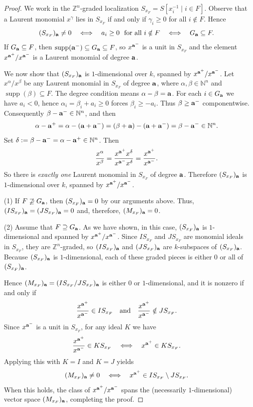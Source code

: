 \documentclass[12pt]{amsart}
\numberwithin{equation}{section}
\theoremstyle{definition}
\theoremstyle{definition}
\DeclareMathOperator{\supp}{supp}
\newcommand{\ZZ}{{\mathbb Z}}
\newcommand{\NN}{{\mathbb N}}
\def\a{{\bold a}}
\begin{document}
\begin{proof}
	We work in the $\ZZ^n$-graded localization $S_{x_F}=S[x_i^{-1}\mid i\in F]$.
	Observe that a Laurent monomial $x^\gamma$ lies in $S_{x_F}$ if and only if $\gamma_i\ge 0$ for all $i\notin F$.
	Hence
	\[
	(S_{x_F})_\a\neq 0 \quad\Longleftrightarrow\quad a_i\ge 0 \ \text{ for all } i\notin F
	\quad\Longleftrightarrow\quad G_\a\subseteq F.
	\]
	If $G_\a\subseteq F$, then $\supp(\a^-)\subseteq G_\a\subseteq F$, so $x^{\a^-}$ is a unit in $S_{x_F}$
	and the element $x^{\a^+}/x^{\a^-}$ is a Laurent monomial of degree $\a$.
	
	We now show that $(S_{x_F})_\a$ is $1$-dimensional over $k$, spanned by $x^{\a^+}/x^{\a^-}$.
	Let $x^\alpha/x^\beta$ be any Laurent monomial in $S_{x_F}$ of degree $\a$, where
	$\alpha,\beta\in\NN^n$ and $\supp(\beta)\subseteq F$. The degree condition means $\alpha-\beta=\a$.
	For each $i\in G_\a$ we have $a_i<0$, hence $\alpha_i=\beta_i+a_i\ge 0$ forces $\beta_i\ge -a_i$.
	Thus $\beta\ge \a^-$ componentwise. Consequently $\beta-\a^-\in\NN^n$, and then
	\[
	\alpha-\a^+=\alpha-(\a+\a^-)= (\beta+\a)-(\a+\a^-)=\beta-\a^-\in\NN^n.
	\]
	Set $\delta:=\beta-\a^-=\alpha-\a^+\in\NN^n$. Then
	\[
	\frac{x^\alpha}{x^\beta}
	=
	\frac{x^{\a^+}x^\delta}{x^{\a^-}x^\delta}
	=
	\frac{x^{\a^+}}{x^{\a^-}}.
	\]
	So there is \emph{exactly one} Laurent monomial in $S_{x_F}$ of degree $\a$.
	Therefore $(S_{x_F})_\a$ is $1$-dimensional over $k$, spanned by $x^{\a^+}/x^{\a^-}$.
	
	\smallskip
(1) If $F\not\supseteq G_\a$, then $(S_{x_F})_\a=0$ by our arguments above. Thus,
	$(I S_{x_F})_\a=(J S_{x_F})_\a=0$ and, therefore, $(M_{x_F})_\a=0$.
	
(2) Assume that $F\supseteq G_\a$. As we have shown, in this case, $(S_{x_F})_\a$ is $1$-dimensional and spanned by
	$x^{\a^+}/x^{\a^-}$. Since $I S_{x_F}$ and $J S_{x_F}$ are monomial ideals in $S_{x_F}$, they
	are $\ZZ^n$-graded, so $(I S_{x_F})_\a$ and $(J S_{x_F})_\a$ are $k$-subspaces of $(S_{x_F})_\a$.
	Because $(S_{x_F})_\a$ is $1$-dimensional, each of these graded pieces is either $0$ or all of
	$(S_{x_F})_\a$.
	
	Hence $(M_{x_F})_\a=(I S_{x_F}/J S_{x_F})_\a$ is either $0$ or $1$-dimensional, and it is nonzero
	if and only if
	\[
	\frac{x^{\a^+}}{x^{\a^-}}\in I S_{x_F}
	\quad\text{and}\quad
	\frac{x^{\a^+}}{x^{\a^-}}\notin J S_{x_F}.
	\]
	Since $x^{\a^-}$ is a unit in $S_{x_F}$, for any ideal $K$ we have
	\[
	\frac{x^{\a^+}}{x^{\a^-}}\in K S_{x_F}
	\quad\Longleftrightarrow\quad
	x^{\a^+}\in K S_{x_F}.
	\]
	Applying this with $K=I$ and $K=J$ yields
	\[
	(M_{x_F})_\a\neq 0
	\quad\Longleftrightarrow\quad
	x^{\a^+}\in I S_{x_F}\setminus J S_{x_F}.
	\]
	When this holds, the class of $x^{\a^+}/x^{\a^-}$ spans the (necessarily $1$-dimensional)
	vector space $(M_{x_F})_\a$, completing the proof.
\end{proof}
\end{document}
